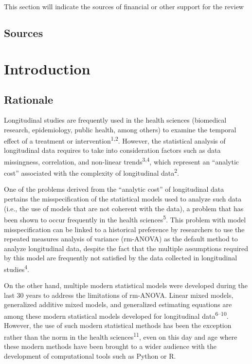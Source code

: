 \documentclass[
]{article}
\begin{document}
This section will indicate the sources of financial or other support for
the review

\hypertarget{sources}{%
\subsection{Sources}\label{sources}}

\hypertarget{introduction}{%
\section{Introduction}\label{introduction}}

\hypertarget{rationale}{%
\subsection{Rationale}\label{rationale}}

Longitudinal studies are frequently used in the health sciences
(biomedical research, epidemiology, public health, among others) to
examine the temporal effect of a treatment or
intervention\textsuperscript{1,2}. However, the statistical analysis of
longitudinal data requires to take into consideration factors such as
data missingness, correlation, and non-linear
trends\textsuperscript{3,4}, which represent an ``analytic cost''
associated with the complexity of longitudinal data\textsuperscript{2}.

One of the problems derived from the ``analytic cost'' of longitudinal
data pertains the misspecification of the statistical models used to
analyze such data (i.e., the use of models that are not coherent with
the data), a problem that has been shown to occur frequently in the
health sciences\textsuperscript{5}. This problem with model
misspecification can be linked to a historical preference by researchers
to use the repeated measures analysis of variance (rm-ANOVA) as the
default method to analyze longitudinal data, despite the fact that the
multiple assumptions required by this model are frequently not satisfied
by the data collected in longitudinal studies\textsuperscript{4}.

On the other hand, multiple modern statistical models were developed
during the last 30 years to address the limitations of rm-ANOVA. Linear
mixed models, generalized additive mixed models, and generalized
estimating equations are among these modern statistical models developed
for longitudinal data\textsuperscript{6--10}. However, the use of such
modern statistical methods has been the exception rather than the norm
in the health sciences\textsuperscript{11}, even on this day and age
where these modern methods have been brought to a wider audience with
the development of computational tools such as Python or R.
\end{document}
